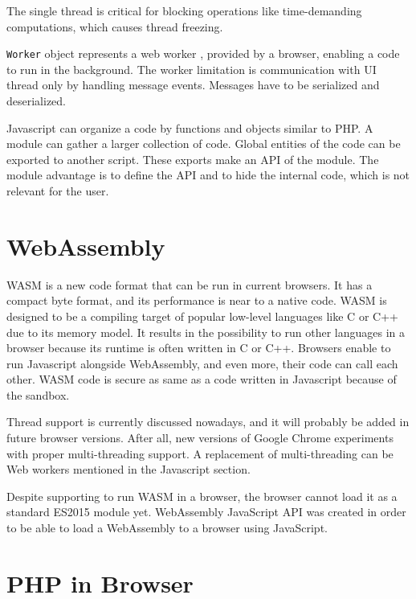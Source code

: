 The single thread is critical for blocking operations like time-demanding computations, which causes thread freezing.
\par
\texttt{Worker} object represents a web worker \cite{online:workers}, provided by a browser, enabling a code to run in the background.
The worker limitation is communication with UI thread only by handling message events. 
Messages have to be serialized and deserialized.
\par
Javascript can organize a code by functions and objects similar to PHP.
A module can gather a larger collection of code.
Global entities of the code can be exported to another script.
These exports make an API of the module.
The module advantage is to define the API and to hide the internal code, which is not relevant for the user.

\section{WebAssembly}

WASM \cite{online:wasmConcepts} is a new code format that can be run in current browsers. 
It has a compact byte format, and its performance is near to a native code. 
WASM is designed to be a compiling target of popular low-level languages like C or C++ due to its memory model.
It results in the possibility to run other languages in a browser because its runtime is often written in C or C++.
Browsers enable to run Javascript alongside WebAssembly, and even more, their code can call each other.
WASM code is secure as same as a code written in Javascript because of the sandbox. 
\par
Thread \cite{online:wasmThreads} support is currently discussed nowadays, and it will probably be added in future browser versions.
After all, new versions of Google Chrome experiments with proper multi-threading support.
A replacement of multi-threading can be Web workers mentioned in the Javascript section.
\par
Despite supporting to run WASM in a browser, the browser cannot load it as a standard ES2015 module yet.
WebAssembly JavaScript API was created in order to be able to load a WebAssembly to a browser using JavaScript.

\section{PHP in Browser}

